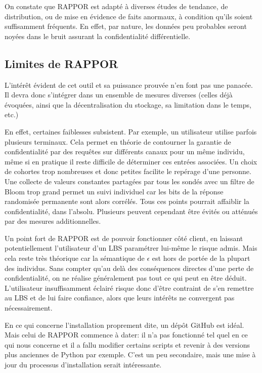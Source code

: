 \documentclass[a4paper,11pt]{article} %
\begin{document}
On constate que RAPPOR est adapté à diverses études de tendance, de distribution, ou de mise en évidence de faits anormaux, à condition qu'ils soient suffisamment fréquents. En effet, par nature, les données peu probables seront noyées dans le bruit assurant la confidentialité différentielle. 
%
\subsection{Limites de RAPPOR}
%
L'intérêt évident de cet outil et sa puissance prouvée n'en font pas une panacée. Il devra donc s'intégrer dans un ensemble de mesures diverses (celles déjà évoquées, ainsi que la décentralisation du stockage, sa limitation dans le temps, etc.)

En effet, certaines faiblesses subsistent. Par exemple, un utilisateur utilise parfois plusieurs terminaux. 
Cela permet en théorie de contourner la garantie de confidentialité par des requêtes sur différents canaux pour un même individu, même si en pratique il reste difficile de déterminer ces entrées associées.
Un choix de cohortes trop nombreuses et donc petites facilite le repérage d'une personne.
Une collecte de valeurs constantes partagées par tous les sondés avec un filtre de Bloom trop grand permet un suivi individuel car les bits de la réponse randomisée permanente sont alors corrélés.
Tous ces points pourrait affaiblir la confidentialité, dans l'absolu. Plusieurs peuvent cependant être évités ou atténués par des mesures additionnelles.

Un point fort de RAPPOR est de pouvoir fonctionner côté client, en laissant potentiellement l'utilisateur d'un LBS paramétrer lui-même le risque admis. 
Mais cela reste très théorique car la sémantique de $\epsilon$ est hors de portée de la plupart des individus. 
Sans compter qu'au delà des conséquences directes d'une perte de confidentialité, on ne réalise généralement pas tout ce qui peut en être déduit. 
L'utilisateur insuffisamment éclairé risque donc d'être contraint de s'en remettre au LBS et de lui faire confiance, alors que leurs intérêts ne convergent pas nécessairement.

En ce qui concerne l'installation proprement dite, un dépôt {GitHub} est idéal. Mais celui de RAPPOR commence à dater: il n'a pas fonctionné tel quel en ce qui nous concerne et il a fallu modifier certains scripts et revenir à des versions plus anciennes de {Python} par exemple. C'est un peu secondaire, mais une mise à jour du processus d'installation serait intéressante.
\end{document}
